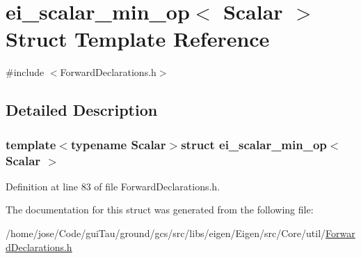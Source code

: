 \hypertarget{structei__scalar__min__op}{\section{ei\-\_\-scalar\-\_\-min\-\_\-op$<$ Scalar $>$ Struct Template Reference}
\label{structei__scalar__min__op}
}


{\ttfamily \#include $<$Forward\-Declarations.\-h$>$}



\subsection{Detailed Description}
\subsubsection*{template$<$typename Scalar$>$struct ei\-\_\-scalar\-\_\-min\-\_\-op$<$ Scalar $>$}



Definition at line 83 of file Forward\-Declarations.\-h.



The documentation for this struct was generated from the following file\-:\begin{DoxyCompactItemize}
\item 
/home/jose/\-Code/gui\-Tau/ground/gcs/src/libs/eigen/\-Eigen/src/\-Core/util/\hyperlink{_forward_declarations_8h}{Forward\-Declarations.\-h}\end{DoxyCompactItemize}
